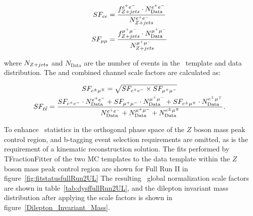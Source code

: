 \begin{linenomath*}
\begin{align}
SF_{ee} &= \frac{f_{Z+jets}^{e^{+}e^{-}} \cdot N_\text{Data}^{e^{+}e^{-}}}{N_{Z+jets}^{e^{+}e^{-}}} \\
SF_{\mu\mu} &= \frac{f_{Z+jets}^{\mu^{+}\mu^{-}} \cdot N_\text{Data}^{\mu^{+}\mu^{-}}}{N_{Z+jets}^{\mu^{+}\mu^{-}}}
\end{align}
\end{linenomath*}
where $N_{Z+jets}$ and $N_\text{Data}$ are the number of events in the \zjets\ template and data distribution.
The \emu and combined channel scale factors are calculated as:
\begin{linenomath*}
\begin{gather}
SF_{e^{\pm}\mu^{\mp}} = \sqrt{SF_{e^{+}e^{-}} \times SF_{\mu^{+}\mu^{-}}} \\
SF_{\ell \bar{\ell}} = \frac{SF_{e^{+}e^{-}} \cdot N_\text{Data}^{e^{+}e^{-}} + SF_{\mu^{+}\mu^{-}} \cdot N_\text{Data}^{\mu^{+}\mu^{-}} + SF_{e^{\pm}\mu^{\mp}} \cdot N_\text{Data}^{e^{\pm}\mu^{\mp}}}{N_\text{Data}^{e^{+}e^{-}} + N_\text{Data}^{\mu^{+}\mu^{-}} + N_\text{Data}^{e^{\pm}\mu^{\mp}}}.
\end{gather}
\end{linenomath*}
To enhance \zjets\ statistics in the orthogonal phase space of the $Z$ boson mass peak control region, \MET and b-tagging event selection requirements are omitted, as is the requirement of a kinematic reconstruction solution.
The fits performed by TFractionFitter of the two MC templates to the data template within the $Z$ boson mass peak control region are shown for Full Run II in figure~\ref{fig:fitstatusfullRun2UL}
The resulting \zjets\ global normalization scale factors are shown in table~\ref{tab:dysffullRun2UL}, and the dilepton invariant mass distribution after applying the scale factors is shown in figure~\ref{Dilepton_Invariant_Mass}.

